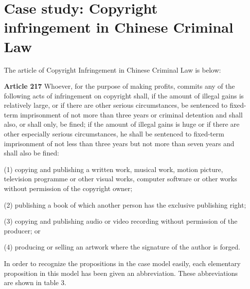 \documentclass{IOS-Book-Article}
\begin{document}
\section{Case study: Copyright infringement in Chinese Criminal Law}




\noindent The article of Copyright Infringement in Chinese Criminal Law\cite{StateCouncil2015series} is below:
\newline

\begin{adjustwidth}{0.5cm}{0cm}
\noindent \textbf{Article 217} Whoever, for the purpose of making profits, commits any of the following acts of infringement on copyright shall, if the amount of illegal gains is relatively large, or if there are other serious circumstances, be sentenced to fixed-term imprisonment of not more than three years or criminal detention and shall also, or shall only, be fined; if the amount of illegal gains is huge or if there are other especially serious circumstances, he shall be sentenced to fixed-term imprisonment of not less than three years but not more than seven years and shall also be fined:

\noindent (1) copying and publishing a written work, musical work, motion picture, television programme or other visual works, computer software or other works without permission of the copyright owner;

\noindent (2) publishing a book of which another person has the exclusive publishing right;

\noindent (3) copying and publishing audio or video recording without permission of the producer; or

\noindent (4) producing or selling an artwork where the signature of the author is forged.\newline
\end{adjustwidth}


In order to recognize the propositions in the case model easily, each elementary proposition in this model has been given an abbreviation. These abbreviations are shown in table 3.
\end{document}
